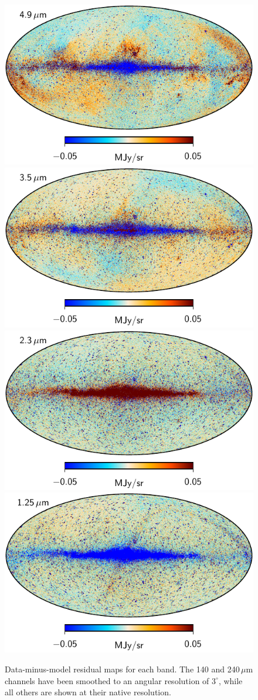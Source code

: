 \documentclass{aa}
\begin{document}
\begin{figure}
        \includegraphics[width=0.39\linewidth]{figs/dirbe_04_todres_v1.pdf}         
        \includegraphics[width=0.39\linewidth]{figs/dirbe_03_todres_v1.pdf}\\
       	\includegraphics[width=0.39\linewidth]{figs/dirbe_02_todres_v1.pdf}
       	\includegraphics[width=0.39\linewidth]{figs/dirbe_01_todres_v1.pdf}       
       	\caption{Data-minus-model residual maps for each band. The 140 and 240\,$\mu$m channels have been smoothed to an angular resolution of $3^{\circ}$, while all others are shown at their native resolution. }
       	\label{fig:res}
       \end{figure}
\end{document}
